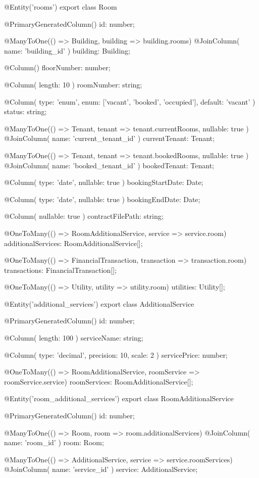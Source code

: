 @Entity('rooms')
export class Room {
  @PrimaryGeneratedColumn()
  id: number;

  @ManyToOne(() => Building, building => building.rooms)
  @JoinColumn({ name: 'building_id' })
  building: Building;

  @Column()
  floorNumber: number;

  @Column({ length: 10 })
  roomNumber: string;

  @Column({ 
    type: 'enum', 
    enum: ['vacant', 'booked', 'occupied'], 
    default: 'vacant' 
  })
  status: string;

  @ManyToOne(() => Tenant, tenant => tenant.currentRooms, { nullable: true })
  @JoinColumn({ name: 'current_tenant_id' })
  currentTenant: Tenant;

  @ManyToOne(() => Tenant, tenant => tenant.bookedRooms, { nullable: true })
  @JoinColumn({ name: 'booked_tenant_id' })
  bookedTenant: Tenant;

  @Column({ type: 'date', nullable: true })
  bookingStartDate: Date;

  @Column({ type: 'date', nullable: true })
  bookingEndDate: Date;

  @Column({ nullable: true })
  contractFilePath: string;

  @OneToMany(() => RoomAdditionalService, service => service.room)
  additionalServices: RoomAdditionalService[];

  @OneToMany(() => FinancialTransaction, transaction => transaction.room)
  transactions: FinancialTransaction[];

  @OneToMany(() => Utility, utility => utility.room)
  utilities: Utility[];
}

@Entity('additional_services')
export class AdditionalService {
  @PrimaryGeneratedColumn()
  id: number;

  @Column({ length: 100 })
  serviceName: string;

  @Column({ type: 'decimal', precision: 10, scale: 2 })
  servicePrice: number;

  @OneToMany(() => RoomAdditionalService, roomService => roomService.service)
  roomServices: RoomAdditionalService[];
}

@Entity('room_additional_services')
export class RoomAdditionalService {
  @PrimaryGeneratedColumn()
  id: number;

  @ManyToOne(() => Room, room => room.additionalServices)
  @JoinColumn({ name: 'room_id' })
  room: Room;

  @ManyToOne(() => AdditionalService, service => service.roomServices)
  @JoinColumn({ name: 'service_id' })
  service: AdditionalService;
}

